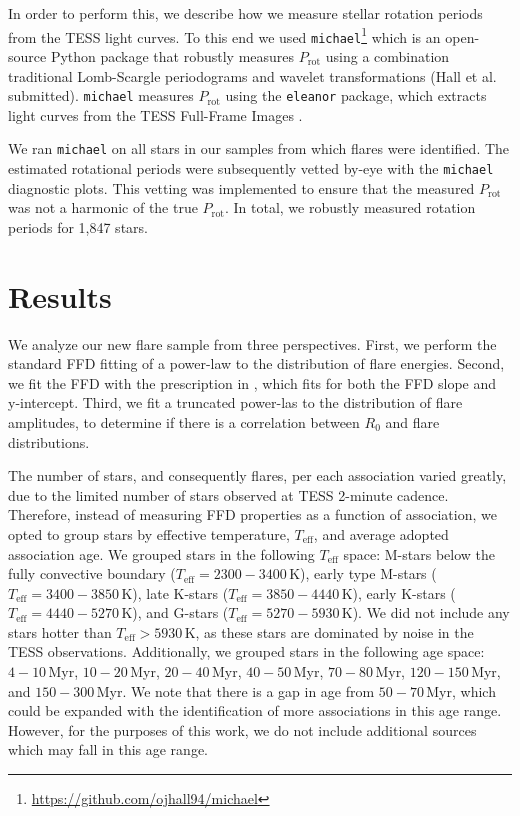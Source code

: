 \documentclass[twocolumn]{aastex631}
\begin{document}
In order to perform this, we describe how we measure stellar rotation periods from the TESS light curves. To this end we used \texttt{michael}\footnote{\url{https://github.com/ojhall94/michael}}
which is an open-source Python package that robustly measures $P_\textrm{rot}$ using a combination
traditional Lomb-Scargle periodograms and wavelet transformations (Hall et al. submitted).
\texttt{michael} measures $P_\textrm{rot}$ using the \texttt{eleanor} package, which
extracts light curves from the TESS Full-Frame Images \citep[FFIs;][]{feinstein19}.


We ran \texttt{michael} on all stars in our samples from which flares were identified. The estimated
rotational periods were subsequently vetted by-eye  with the \texttt{michael} diagnostic plots. This vetting was implemented to ensure that the measured $P_\textrm{rot}$ was not a harmonic of the true $P_\textrm{rot}$. In
total, we robustly measured rotation periods for 1,847 stars.

\section{Results}\label{sec:results}

We analyze our new flare sample from three perspectives. First, we perform the standard
FFD fitting of a power-law to the distribution of flare energies. Second, we fit the FFD with the
prescription in \cite{gershberg72}, which fits for both the FFD slope and y-intercept.
Third, we fit a truncated power-las to the distribution of flare amplitudes, to determine
if there is a correlation between $R_0$ and flare distributions.

The number of stars, and consequently flares, per each association varied greatly,
due to the limited number of stars observed at TESS 2-minute cadence. Therefore, instead
of measuring FFD properties as a function of association, we opted to group stars
by effective temperature, $T_\textrm{eff}$, and average adopted association age. We
grouped stars in the following $T_\textrm{eff}$ space: M-stars below the fully
convective boundary ($T_\textrm{eff} = 2300 - 3400$\,K), early type M-stars
($T_\textrm{eff} = 3400 - 3850$\,K), late K-stars ($T_\textrm{eff} = 3850 - 4440$\,K),
early K-stars ($T_\textrm{eff} = 4440 - 5270$\,K), and G-stars ($T_\textrm{eff} = 5270 - 5930$\,K).
We did not include any stars hotter than $T_\textrm{eff} > 5930$\,K, as these stars
are dominated by noise in the TESS observations. Additionally, we grouped stars
in the following age space: $4-10$\,Myr, $10-20$\,Myr, $20-40$\,Myr, $40-50$\,Myr,
$70-80$\,Myr, $120-150$\,Myr, and $150-300$\,Myr. We note that there is a gap in
age from $50-70$\,Myr, which could be expanded with the identification of more
associations in this age range. However, for the purposes of this work, we do not
include additional sources which may fall in this age range.
\end{document}
